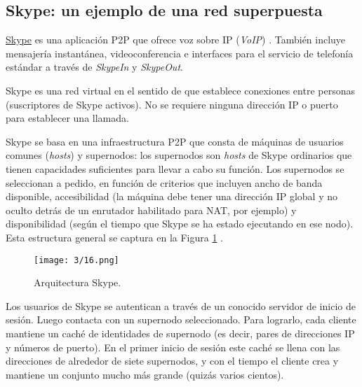 { \subsection{Skype: un ejemplo de una red superpuesta}
  \label{Skype}
 \href{https://www.skype.com}{Skype} es una aplicación P2P que ofrece voz sobre IP (\textit{VoIP}) . También incluye mensajería instantánea, videoconferencia e interfaces para el servicio de telefonía estándar a través de \textit{SkypeIn} y \textit{SkypeOut}.  
  
 Skype es una red virtual en el sentido de que establece conexiones entre personas (suscriptores de Skype activos). No se requiere ninguna dirección IP o puerto para establecer una llamada.

 
 \begin{description}  
 	\item[Arquitectura de Skype]  Skype se basa en una infraestructura P2P que consta de  máquinas de usuarios comunes (\textit{hosts}) y supernodos: los supernodos son \textit{hosts} de Skype ordinarios que tienen capacidades suficientes para llevar a cabo su funci\'on. Los supernodos se seleccionan a pedido, en función  de criterios que incluyen ancho de banda disponible, accesibilidad (la máquina debe tener una dirección IP global y no  oculto detrás de un enrutador habilitado para NAT, por ejemplo) y disponibilidad (según el tiempo que Skype se ha estado ejecutando en ese nodo). Esta estructura general   	se captura en la Figura \ref{fig:skype} .
 	
 	
 	\begin{figure}%
 		\texttt{[image: 3/16.png]}
 		\caption{Arquitectura Skype.}
 		\label{fig:skype}
 	\end{figure}
 	
 	\item[Conexión de usuario]  Los usuarios de Skype se autentican a través de un conocido servidor de inicio de sesión. Luego contacta con un supernodo seleccionado. Para lograrlo, cada cliente mantiene un caché de identidades de supernodo (es decir, pares de direcciones IP y números de puerto). En el primer inicio de sesión este caché se llena con las direcciones de alrededor de siete supernodos, y con el tiempo el  cliente crea y mantiene un conjunto mucho más grande (quizás varios cientos).
 	

\end{description}}

